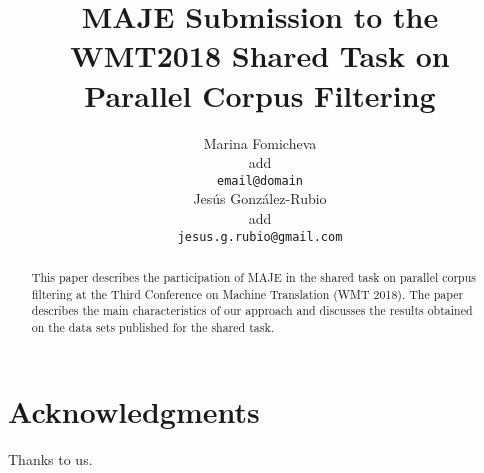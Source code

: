 \documentclass[11pt,a4paper]{article}
\title{MAJE Submission to the WMT2018 Shared Task on\\Parallel Corpus Filtering}
\author{Marina Fomicheva \\
  add \\
  {\tt email@domain} \\\And
  Jes\'us Gonz\'alez-Rubio \\
  add\\
  {\tt jesus.g.rubio@gmail.com} \\}
\date{}
\begin{document}
\maketitle
\begin{abstract}
  This paper describes the participation of MAJE in the shared task on parallel corpus filtering at the Third Conference on Machine Translation (WMT 2018). The paper describes the main characteristics of our approach and discusses the results obtained on the data sets published for the shared task.
\end{abstract}








\section*{Acknowledgments}
Thanks to us.





\end{document}
